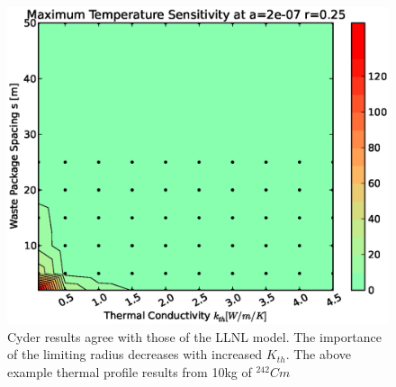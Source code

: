 \begin{figure}[htbp!]
\begin{center}
\includegraphics[width=\columnwidth]{./thermal_demonstration/conductivity/ks.eps}
\end{center}
\caption[$K_{th}$ vs. Waste Package Spacing Sensitivity in Cyder]{Cyder results agree with 
those of the LLNL model. The importance of the limiting radius decreases with 
increased $K_{th}$. The above example thermal profile results from 10kg of 
$^{242}Cm$}
\label{fig:ks}
\end{figure}


